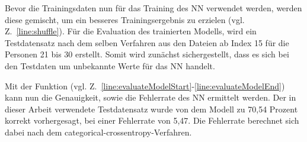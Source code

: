 Bevor die Trainingsdaten nun für das Training des \ac{NN} verwendet werden, werden diese gemischt, um ein besseres Trainingsergebnis zu erzielen (vgl. Z.~\ref{line:shuffle}).
\newline
\newline
Für die Evaluation des trainierten Modells, wird ein Testdatensatz nach dem selben Verfahren aus den Dateien ab Index 15 für die Personen 21 bis 30 erstellt.
Somit wird zunächst sichergestellt, dass es sich bei den Testdaten um unbekannte Werte für das \ac{NN} handelt.

Mit der Funktion  (vgl. Z.~\ref{line:evaluateModelStart}-\ref{line:evaluateModelEnd}) kann nun die Genauigkeit, sowie die Fehlerrate des \ac{NN} ermittelt werden.
Der in dieser Arbeit verwendete Testdatensatz wurde von dem Modell zu 70,54 Prozent korrekt vorhergesagt, bei einer Fehlerrate von 5,47.
Die Fehlerrate berechnet sich dabei nach dem categorical-crossentropy-Verfahren.

